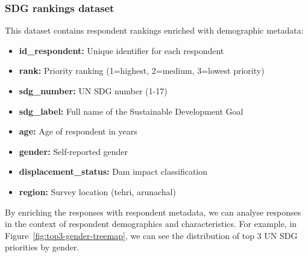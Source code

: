 \documentclass{article}
\begin{document}
\subsubsection{SDG rankings dataset}

This dataset contains respondent rankings enriched with demographic metadata:
\begin{itemize}
  \item \textbf{id\_respondent:} Unique identifier for each respondent
  \item \textbf{rank:} Priority ranking (1=highest, 2=medium, 3=lowest priority)
  \item \textbf{sdg\_number:} UN SDG number (1-17)
  \item \textbf{sdg\_label:} Full name of the Sustainable Development Goal
  \item \textbf{age:} Age of respondent in years
  \item \textbf{gender:} Self-reported gender
  \item \textbf{displacement\_status:} Dam impact classification
  \item \textbf{region:} Survey location (tehri, arunachal)
\end{itemize}

By enriching the responses with respondent metadata, we can analyse responses in the context of respondent demographics and characteristics. For example, in Figure~\ref{fig:top3-gender-treemap}, we can see the distribution of top 3 UN SDG priorities by gender.
\end{document}
